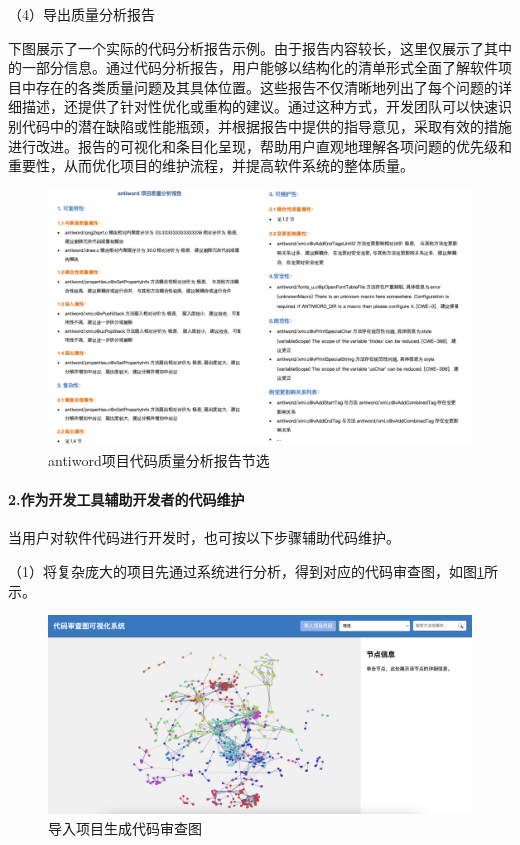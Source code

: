 \noindent（4）导出质量分析报告

下图展示了一个实际的代码分析报告示例。由于报告内容较长，这里仅展示了其中的一部分信息。通过代码分析报告，用户能够以结构化的清单形式全面了解软件项目中存在的各类质量问题及其具体位置。这些报告不仅清晰地列出了每个问题的详细描述，还提供了针对性优化或重构的建议。通过这种方式，开发团队可以快速识别代码中的潜在缺陷或性能瓶颈，并根据报告中提供的指导意见，采取有效的措施进行改进。报告的可视化和条目化呈现，帮助用户直观地理解各项问题的优先级和重要性，从而优化项目的维护流程，并提高软件系统的整体质量。

\clearpage

\begin{figure}[h]
\centering
\includegraphics[width = 1.0\textwidth]{figures/报告.png}
\caption{antiword项目代码质量分析报告节选}
\end{figure}


\paragraph{2.作为开发工具辅助开发者的代码维护} 当用户对软件代码进行开发时，也可按以下步骤辅助代码维护。

\noindent（1）将复杂庞大的项目先通过系统进行分析，得到对应的代码审查图，如图\ref{1_导入项目生成代码审查图}所示。

\begin{figure}[h]
\centering
\includegraphics[width = 1.0\textwidth]{figures/开发1.jpg}
\caption{导入项目生成代码审查图}
\label{1_导入项目生成代码审查图}
\end{figure}

